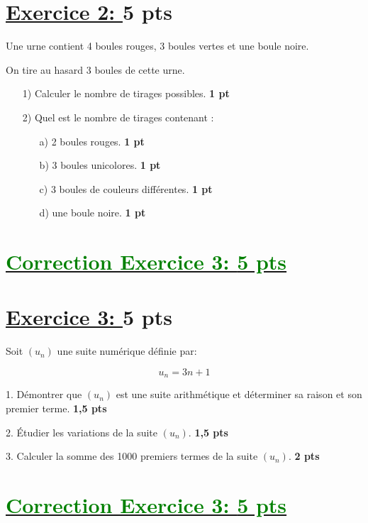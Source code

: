 \documentclass[12pt]{article}
\begin{document}
\section*{\underline{Exercice 2: }\textbf{5 pts}}
Une urne contient 4 boules rouges, 3 boules vertes et une boule noire.

On tire au hasard 3 boules de cette urne.

\begin{itemize}
\item[1)] Calculer le nombre de tirages possibles. \textbf{1 pt}
\item[2)] Quel est le nombre de tirages contenant :
\begin{itemize}
\item[a)] 2 boules rouges. \textbf{1 pt}
\item[b)] 3 boules unicolores. \textbf{1 pt}
\item[c)] 3 boules de couleurs différentes. \textbf{1 pt}
\item[d)] une boule noire. \textbf{1 pt}
\end{itemize}
\end{itemize}
\section*{\underline{\textcolor{green}{Correction Exercice 3: \textbf{5 pts}}}}
\section*{\underline{Exercice 3: }\textbf{5 pts}}
Soit $(u_n)$ une suite numérique définie par:

\[ u_n = 3n + 1 \]

1. Démontrer que $(u_n)$ est une suite arithmétique et déterminer sa raison et son premier terme. \textbf{1,5 pts}

2. Étudier les variations de la suite $(u_n)$. \textbf{1,5 pts}

3. Calculer la somme des 1000 premiers termes de la suite $(u_n)$. \textbf{2 pts}

\section*{\underline{\textcolor{green}{Correction Exercice 3: \textbf{5 pts}}}}
\end{document}
